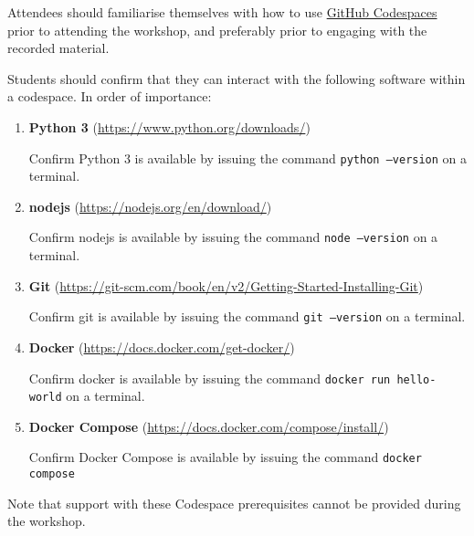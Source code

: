 \documentclass{article}
\begin{document}
Attendees should familiarise themselves with how to use \href{https://github.com/codespaces}{GitHub Codespaces} prior to attending the workshop, and preferably prior to engaging with the recorded material.

Students should confirm that they can interact with the following software within a codespace.
In order of importance:

\begin{enumerate}

    \item \textbf{Python 3}
    (\href{https://www.python.org/downloads/}{https://www.python.org/downloads/})

    Confirm Python 3 is available by issuing the command
    \texttt{python --version} on a terminal.

    \item \textbf{nodejs}
    (\href{https://nodejs.org/en/download/}{https://nodejs.org/en/download/})

    Confirm nodejs is available by issuing the command
    \texttt{node --version} on a terminal.

    \item \textbf{Git}
    (\href{https://git-scm.com/book/en/v2/Getting-Started-Installing-Git}{https://git-scm.com/book/en/v2/Getting-Started-Installing-Git})

    Confirm git is available by issuing the command
    \texttt{git --version} on a terminal.

    \item \textbf{Docker}
    (\href{https://docs.docker.com/get-docker/}{https://docs.docker.com/get-docker/})

    Confirm docker is available by issuing the command
    \texttt{docker run hello-world} on a terminal.

    \item \textbf{Docker Compose}
    (\href{https://docs.docker.com/compose/install/}{https://docs.docker.com/compose/install/})

    Confirm Docker Compose is available by issuing the command \newline
    \texttt{docker compose}

\end{enumerate}

Note that support with these Codespace prerequisites cannot be provided during the workshop.
\end{document}
